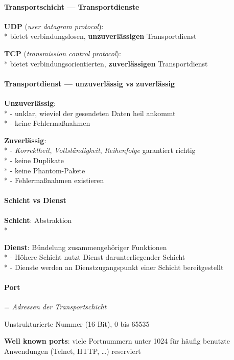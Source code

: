 \paragraph{Transportschicht --- Transportdienste}
\begin{items}
  \item \textbf{UDP} (\emph{user datagram protocol}): \\*
    bietet verbindungslosen, \textbf{unzuverlässigen} Transportdienst
  \item \textbf{TCP} (\emph{transmission control protocol}): \\*
    bietet verbindungsorientierten, \textbf{zuverlässigen} Transportdienst
\end{items}

\paragraph{Transportdienst --- unzuverlässig vs zuverlässig}
\begin{items}
  \item \textbf{Unzuverlässig}: \\*
    - unklar, wieviel der gesendeten Daten heil ankommt \\*
    - keine Fehlermaßnahmen
  \item \textbf{Zuverlässig}: \\*
    - \emph{Korrektheit}, \emph{Vollständigkeit}, \emph{Reihenfolge} garantiert richtig \\*
    - keine Duplikate \\*
    - keine Phantom-Pakete \\*
    - Fehlermaßnahmen existieren
\end{items}

\paragraph{Schicht vs Dienst}
\begin{items}
  \item \textbf{Schicht}: Abstraktion \\*
  \item \textbf{Dienst}: Bündelung zusammengehöriger Funktionen \\*
    - Höhere Schicht nutzt Dienst darunterliegender Schicht \\*
    - Dienste werden an Dienstzugangspunkt einer Schicht bereitgestellt
\end{items}

\paragraph{Port}
\begin{items}
  \item = \emph{Adressen der Transportschicht}
  \item Unstrukturierte Nummer (16 Bit), 0 bis 65535
  \item \textbf{Well known ports}: viele Portnummern unter 1024 für häufig benutzte Anwendungen (Telnet, HTTP, \dots) reserviert
\end{items}


